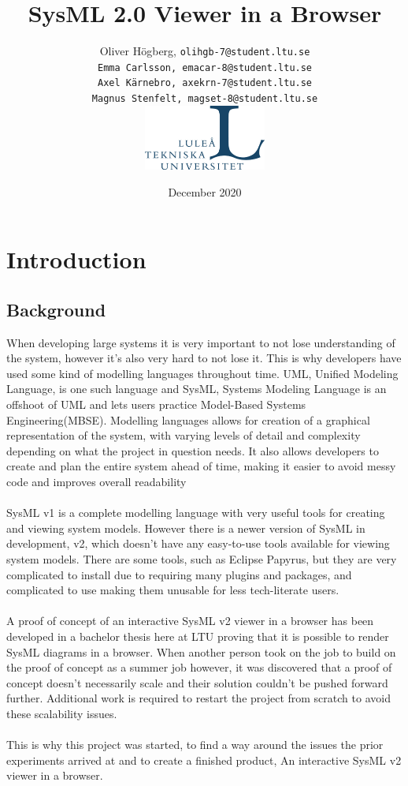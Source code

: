\documentclass{article}
\title{SysML 2.0 Viewer in a Browser}
\author{Oliver Högberg, \tt olihgb-7@student.ltu.se \\ 
Emma Carlsson, \tt emacar-8@student.ltu.se \\ 
Axel Kärnebro, \tt axekrn-7@student.ltu.se \\ 
Magnus Stenfelt, \tt magset-8@student.ltu.se \\

\includegraphics[width=0.3\textwidth]{ltu_swe.jpg}}
\date{December 2020}
\begin{document}
\maketitle
\newpage
\tableofcontents
\newpage

\section{Introduction}

\subsection{Background}
When developing large systems it is very important to not lose understanding of the system, however it's also very hard to not lose it. This is why developers have used some kind of modelling languages throughout time. UML, Unified Modeling Language, is one such language and SysML, Systems Modeling Language is an offshoot of UML and lets users practice Model-Based Systems Engineering(MBSE).  Modelling languages allows for creation of a graphical representation of the system, with varying levels of detail and complexity depending on what the project in question needs. It also allows developers to create and plan the entire system ahead of time, making it easier to avoid messy code and improves overall readability 
\\ \\
SysML v1 is a complete modelling language with very useful tools for creating and viewing system models. However there is a newer version of SysML in development, v2, which doesn't have any easy-to-use tools available for viewing system models. There are some tools, such as Eclipse Papyrus, but they are very complicated to install due to requiring many plugins and packages, and complicated to use making them unusable for less tech-literate users.
\\ \\
A proof of concept of an interactive SysML v2 viewer in a browser has been developed in a bachelor thesis here at LTU \cite{Jesper2020} proving that it is possible to render SysML diagrams in a browser. When another person took on the job to build on the proof of concept as a summer job however, it was discovered that a proof of concept doesn't necessarily scale and their solution couldn't be pushed forward further. Additional work is required to restart the project from scratch to avoid these scalability issues. 
\\ \\
This is why this project was started, to find a way around the issues the prior experiments arrived at and to create a finished product, An interactive SysML v2 viewer in a browser.
\end{document}
